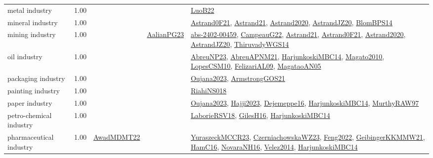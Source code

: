 {\begin{longtable}{p{3cm}r>{\raggedright\arraybackslash}p{6cm}>{\raggedright\arraybackslash}p{6cm}>{\raggedright\arraybackslash}p{8cm}}
\index{metal industry}\index{Industries!metal industry}metal industry &  1.00 &  &  & \hyperref[detail:LuoB22]{LuoB22}\\
\index{mineral industry}\index{Industries!mineral industry}mineral industry &  1.00 &  &  & \hyperref[detail:Astrand0F21]{Astrand0F21}, \hyperref[detail:Astrand21]{Astrand21}, \hyperref[detail:Astrand2020]{Astrand2020}, \hyperref[detail:AstrandJZ20]{AstrandJZ20}, \hyperref[detail:BlomBPS14]{BlomBPS14}\\
\index{mining industry}\index{Industries!mining industry}mining industry &  1.00 &  & \hyperref[detail:AalianPG23]{AalianPG23} & \hyperref[detail:abs-2402-00459]{abs-2402-00459}, \hyperref[detail:CampeauG22]{CampeauG22}, \hyperref[detail:Astrand21]{Astrand21}, \hyperref[detail:Astrand0F21]{Astrand0F21}, \hyperref[detail:Astrand2020]{Astrand2020}, \hyperref[detail:AstrandJZ20]{AstrandJZ20}, \hyperref[detail:ThiruvadyWGS14]{ThiruvadyWGS14}\\
\index{oil industry}\index{Industries!oil industry}oil industry &  1.00 &  &  & \hyperref[detail:AbreuNP23]{AbreuNP23}, \hyperref[detail:AbreuAPNM21]{AbreuAPNM21}, \hyperref[detail:HarjunkoskiMBC14]{HarjunkoskiMBC14}, \hyperref[detail:Magato2010]{Magato2010}, \hyperref[detail:LopesCSM10]{LopesCSM10}, \hyperref[detail:FelizariAL09]{FelizariAL09}, \hyperref[detail:MagataoAN05]{MagataoAN05}\\
\index{packaging industry}\index{Industries!packaging industry}packaging industry &  1.00 &  &  & \hyperref[detail:Oujana2023]{Oujana2023}, \hyperref[detail:ArmstrongGOS21]{ArmstrongGOS21}\\
\index{painting industry}\index{Industries!painting industry}painting industry &  1.00 &  &  & \hyperref[detail:RiahiNS018]{RiahiNS018}\\
\index{paper industry}\index{Industries!paper industry}paper industry &  1.00 &  &  & \hyperref[detail:Oujana2023]{Oujana2023}, \hyperref[detail:Hajji2023]{Hajji2023}, \hyperref[detail:Dejemeppe16]{Dejemeppe16}, \hyperref[detail:HarjunkoskiMBC14]{HarjunkoskiMBC14}, \hyperref[detail:MurthyRAW97]{MurthyRAW97}\\
\index{petro-chemical industry}\index{Industries!petro-chemical industry}petro-chemical industry &  1.00 &  &  & \hyperref[detail:LaborieRSV18]{LaborieRSV18}, \hyperref[detail:GilesH16]{GilesH16}, \hyperref[detail:HarjunkoskiMBC14]{HarjunkoskiMBC14}\\
\index{pharmaceutical industry}\index{Industries!pharmaceutical industry}pharmaceutical industry &  1.00 & \hyperref[detail:AwadMDMT22]{AwadMDMT22} &  & \hyperref[detail:YuraszeckMCCR23]{YuraszeckMCCR23}, \hyperref[detail:CzerniachowskaWZ23]{CzerniachowskaWZ23}, \hyperref[detail:Feng2022]{Feng2022}, \hyperref[detail:GeibingerKKMMW21]{GeibingerKKMMW21}, \hyperref[detail:HamC16]{HamC16}, \hyperref[detail:NovaraNH16]{NovaraNH16}, \hyperref[detail:Velez2014]{Velez2014}, \hyperref[detail:HarjunkoskiMBC14]{HarjunkoskiMBC14}\\

\end{longtable}}
